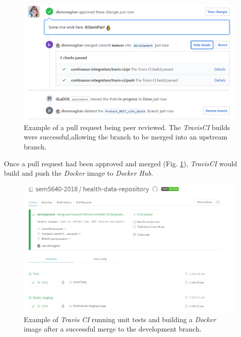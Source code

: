 \begin{figure}[H]
    \centering
    \includegraphics[width=\textwidth]{Images/approve_pr.png}
    \caption{Example of a pull request being peer reviewed. The \textit{TravisCI} builds were successful,allowing the branch to be merged into an upstream branch.}
    \label{fig:approve_pull_request}
\end{figure}

Once a pull request had been approved and merged (Fig. \ref{fig:approve_pull_request}), \textit{TravisCI} would build and push the \textit{Docker} image to \textit{Docker Hub}.

\begin{figure}[H]
    \centering
    \includegraphics[width=\textwidth]{Images/travis_builds_overview.png}
    \caption{Example of \textit{Travis CI} running unit tests and building a \textit{Docker} image after a successful merge to the development branch.}
    \label{fig:travis_ui}
\end{figure}

